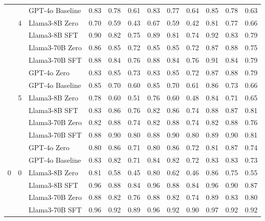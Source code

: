 \begin{longtable}[t]{ll>{}l|rr>{}r|rr>{}r|rrr}
 &  & GPT-4o Baseline & 0.83 & 0.78 & 0.61 & 0.83 & 0.77 & 0.64 & 0.85 & 0.78 & 0.63\\
\cmidrule{2-12}
 & 4 & Llama3-8B Zero & 0.70 & 0.59 & 0.43 & 0.67 & 0.59 & 0.42 & 0.81 & 0.77 & 0.66\\

 &  & Llama3-8B SFT & 0.90 & 0.82 & 0.75 & 0.89 & 0.81 & 0.74 & 0.92 & 0.83 & 0.79\\

 &  & Llama3-70B Zero & 0.86 & 0.85 & 0.72 & 0.85 & 0.85 & 0.72 & 0.87 & 0.88 & 0.75\\

 &  & Llama3-70B SFT & 0.88 & 0.84 & 0.76 & 0.88 & 0.84 & 0.76 & 0.91 & 0.84 & 0.79\\

 &  & GPT-4o Zero & 0.83 & 0.85 & 0.73 & 0.83 & 0.85 & 0.72 & 0.87 & 0.88 & 0.79\\

 &  & GPT-4o Baseline & 0.85 & 0.70 & 0.60 & 0.85 & 0.70 & 0.61 & 0.86 & 0.73 & 0.66\\
\cmidrule{2-12}
 & 5 & Llama3-8B Zero & 0.78 & 0.60 & 0.51 & 0.76 & 0.60 & 0.48 & 0.84 & 0.71 & 0.65\\

 &  & Llama3-8B SFT & 0.83 & 0.86 & 0.76 & 0.82 & 0.86 & 0.74 & 0.88 & 0.87 & 0.81\\

 &  & Llama3-70B Zero & 0.82 & 0.88 & 0.74 & 0.82 & 0.88 & 0.74 & 0.82 & 0.88 & 0.76\\

 &  & Llama3-70B SFT & 0.88 & 0.90 & 0.80 & 0.88 & 0.90 & 0.80 & 0.89 & 0.90 & 0.81\\

 &  & GPT-4o Zero & 0.80 & 0.86 & 0.71 & 0.80 & 0.86 & 0.72 & 0.81 & 0.87 & 0.74\\

 &  & GPT-4o Baseline & 0.83 & 0.82 & 0.71 & 0.84 & 0.82 & 0.72 & 0.83 & 0.83 & 0.73\\
\cmidrule{1-12}
0 & 0 & Llama3-8B Zero & 0.81 & 0.58 & 0.45 & 0.80 & 0.62 & 0.46 & 0.86 & 0.75 & 0.55\\

 &  & Llama3-8B SFT & 0.96 & 0.88 & 0.84 & 0.96 & 0.88 & 0.84 & 0.96 & 0.90 & 0.87\\

 &  & Llama3-70B Zero & 0.88 & 0.82 & 0.76 & 0.88 & 0.82 & 0.74 & 0.89 & 0.83 & 0.80\\

 &  & Llama3-70B SFT & 0.96 & 0.92 & 0.89 & 0.96 & 0.92 & 0.90 & 0.97 & 0.92 & 0.92\\


\end{longtable}
